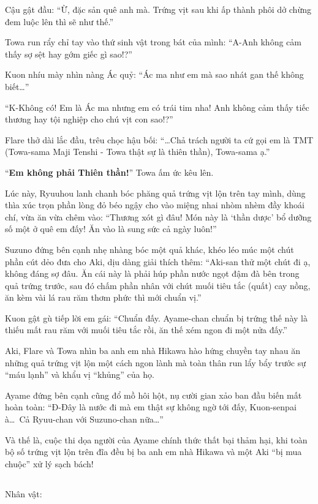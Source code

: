 \documentclass[../main.tex]{subfiles}
\begin{document}
Cậu gật đầu: ``Ừ, đặc sản quê anh mà. Trứng vịt sau khi ấp thành phôi dở chừng đem luộc lên thì sẽ như thế.''

Towa run rẩy chỉ tay vào thứ sinh vật trong bát của mình: ``A-Anh không cảm thấy sợ sệt hay gớm giếc gì sao!?''

Kuon nhíu mày nhìn nàng Ác quỷ: ``Ác ma như em mà sao nhát gan thế không biết\dots''

``K-Không có! Em là Ác ma nhưng em có trái tim nha! Anh không cảm thấy tiếc thương hay tội nghiệp cho chú vịt con sao!?''

Flare thở dài lắc đầu, trêu chọc hậu bối: ``\dots Chả trách người ta cứ gọi em là TMT (Towa-sama Maji Tenshi - Towa thật sự là thiên thần), Towa-sama ạ.''

``\textbf{Em không phải Thiên thần!}'' Towa ấm ức kêu lên.

Lúc này, Ryuuhou lanh chanh bóc phăng quả trứng vịt lộn trên tay mình, dùng thìa xúc trọn phần lòng đỏ béo ngậy cho vào miệng nhai nhòm nhèm đầy khoái chí, vừa ăn vừa chêm vào: ``Thương xót gì đâu! Món này là `thần dược' bổ dưỡng số một ở quê em đấy! Ăn vào là sung sức cả ngày luôn!''

Suzuno đứng bên cạnh nhẹ nhàng bóc một quả khác, khéo léo múc một chút phần cút dẻo đưa cho Aki, dịu dàng giải thích thêm: ``Aki-san thử một chút đi ạ, không đáng sợ đâu. Ăn cái này là phải húp phần nước ngọt đậm đà bên trong quả trứng trước, sau đó chấm phần nhân với chút muối tiêu tắc (quất) cay nồng, ăn kèm vài lá rau răm thơm phức thì mới chuẩn vị.''

Kuon gật gù tiếp lời em gái: ``Chuẩn đấy. Ayame-chan chuẩn bị trứng thế này là thiếu mất rau răm với muối tiêu tắc rồi, ăn thế xém ngon đi một nửa đấy.''

Aki, Flare và Towa nhìn ba anh em nhà Hikawa hào hứng chuyền tay nhau ăn những quả trứng vịt lộn một cách ngon lành mà toàn thân run lẩy bẩy trước sự ``máu lạnh'' và khẩu vị ``khủng'' của họ.

Ayame đứng bên cạnh cũng đổ mồ hôi hột, nụ cười gian xảo ban đầu biến mất hoàn toàn: ``Đ-Đây là nước đi mà em thật sự không ngờ tới đấy, Kuon-senpai à\dots\ Cả Ryuu-chan với Suzuno-chan nữa\dots''

Và thế là, cuộc thi dọa người của Ayame chính thức thất bại thảm hại, khi toàn bộ số trứng vịt lộn trên đĩa đều bị ba anh em nhà Hikawa và một Aki ``bị mua chuộc'' xử lý sạch bách!

\newpage

\subsection*{\label{ep-C9.IX}}
\vspace{-4pt}
\begin{center}
  {\caviar\fontsize{12pt}{12pt}\selectfont Nhân vật:    }
\end{center}
\end{document}
